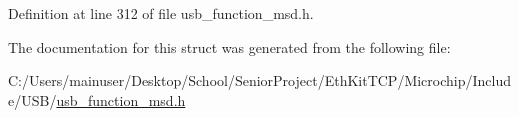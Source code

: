 Definition at line 312 of file usb\+\_\+function\+\_\+msd.\+h.



The documentation for this struct was generated from the following file\+:\begin{DoxyCompactItemize}
\item 
C\+:/\+Users/mainuser/\+Desktop/\+School/\+Senior\+Project/\+Eth\+Kit\+T\+C\+P/\+Microchip/\+Include/\+U\+S\+B/\hyperlink{usb__function__msd_8h}{usb\+\_\+function\+\_\+msd.\+h}\end{DoxyCompactItemize}
